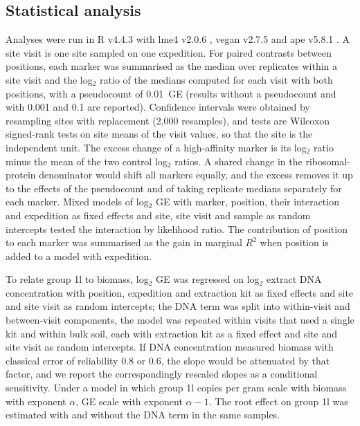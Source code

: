 \documentclass[11pt]{article}
\begin{document}
\subsection*{Statistical analysis}
Analyses were run in R v4.4.3 with lme4 v2.0.6 \citep{bates2015lme4}, vegan v2.7.5
\citep{oksanen2025vegan} and ape v5.8.1 \citep{paradis2019ape}. A site visit is one site sampled on one
expedition. For paired contrasts between positions, each marker was summarised as the median over
replicates within a site visit and the log$_2$ ratio of the medians computed for each visit with both
positions, with a pseudocount of 0.01~GE (results without a pseudocount and with 0.001 and 0.1 are
reported). Confidence intervals were obtained by resampling sites with replacement (2{,}000 resamples), and
tests are Wilcoxon signed-rank tests on site means of the visit values, so that the site is the
independent unit. The excess change of a high-affinity marker is its log$_2$ ratio minus the mean of the
two control log$_2$ ratios. A shared change in the ribosomal-protein denominator would shift all markers
equally, and the excess removes it up to the effects of the pseudocount and of taking replicate medians
separately for each marker. Mixed models of log$_2$ GE with marker, position, their interaction and
expedition as fixed effects and site, site visit and sample as random intercepts tested the interaction
by likelihood ratio. The contribution of position to each marker was summarised as the gain in marginal
$R^2$ when position is added to a model with expedition.

To relate group 1l to biomass, log$_2$ GE was regressed on log$_2$ extract DNA concentration with position,
expedition and extraction kit as fixed effects and site and site visit as random intercepts; the DNA term
was split into within-visit and between-visit components, the model was repeated within visits that used a
single kit and within bulk soil, each with extraction kit as a fixed effect and site and site visit as
random intercepts. If DNA concentration measured biomass with classical error of reliability 0.8 or 0.6,
the slope would be attenuated by that factor, and we report the correspondingly rescaled slopes as a
conditional sensitivity. Under a model in which group 1l copies per gram scale with biomass with exponent
$\alpha$, GE scale with exponent $\alpha-1$. The root effect on group 1l was estimated with and without the
DNA term in the same samples.
\end{document}
